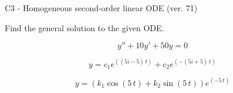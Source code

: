 \begin{exercise}
  \begin{exerciseTitle}C3 - Homogeneous second-order linear ODE (ver. 71)\end{exerciseTitle}
  \begin{exerciseStatement}
    
Find the general solution to the given ODE.

    
\[y''+10y'+50y = 0\]

  \end{exerciseStatement}
  \begin{exerciseAnswer}
    
\[y= c_{1} e^{\left(\left(5 i - 5\right) \, t\right)} + c_{2} e^{\left(-\left(5 i + 5\right) \, t\right)}\]

    
\[y= {\left(k_{1} \cos\left(5 \, t\right) + k_{2} \sin\left(5 \, t\right)\right)} e^{\left(-5 \, t\right)}\]

  \end{exerciseAnswer}
\end{exercise}